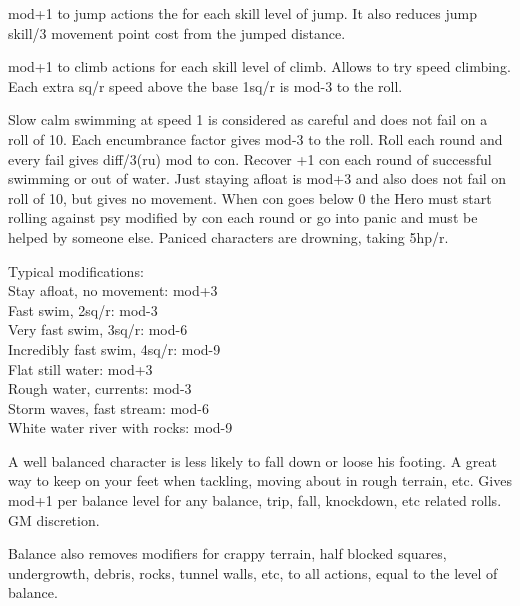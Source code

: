 \openskillslist



 mod+1 to jump actions the for each skill level of jump. It also reduces jump skill/3 movement point cost from the jumped distance.


 mod+1 to climb actions for each skill level of climb. Allows to try speed climbing. Each extra sq/r speed above the base 1sq/r is mod-3 to the roll.


Slow calm swimming at speed 1 is considered as careful and does not fail on a roll of 10. Each encumbrance factor gives mod-3 to the roll. Roll each round and every fail gives diff/3(ru) mod to con. Recover +1 con each round of successful swimming or out of water. Just staying afloat is mod+3 and also does not fail on roll of 10, but gives no movement. When con goes below 0 the Hero must start rolling against psy modified by con each round or go into panic and must be helped by someone else. Paniced characters are drowning, taking 5hp/r.

Typical modifications:\\
Stay afloat, no movement: mod+3\\
Fast swim, 2sq/r: mod-3\\
Very fast swim, 3sq/r: mod-6\\
Incredibly fast swim, 4sq/r: mod-9\\
Flat still water: mod+3\\
Rough water, currents: mod-3\\
Storm waves, fast stream: mod-6\\
White water river with rocks: mod-9


 A well balanced character is less likely to fall down or loose his footing. A great way to keep on your feet when tackling, moving about in rough terrain, etc. Gives mod+1 per balance level for any balance, trip, fall, knockdown, etc related rolls. GM discretion.

Balance also removes modifiers for crappy terrain, half blocked squares, undergrowth, debris, rocks, tunnel walls, etc, to all actions, equal to the level of balance.

